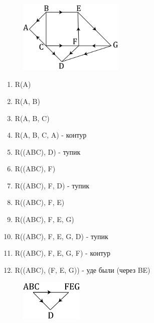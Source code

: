 \documentclass[discrete.tex]{subfiles}
\begin{document}
  \begin{example}\
    \begin{figure}[H]
            \includegraphics[width=5cm]{pics/39_1}
            \centering
    \end{figure}
    \begin{enumerate}
      \item R(A)
      \item R(A, B)
      \item R(A, B, C)
      \item R(A, B, C, A) - контур
      \item R((ABC), D) - тупик
      \item R((ABC), F)
      \item R((ABC), F, D) - тупик
      \item R((ABC), F, E)
      \item R((ABC), F, E, G)
      \item R((ABC), F, E, G, D) - тупик
      \item R((ABC), F, E, G, F) - контур
      \item R((ABC), (F, E, G)) - уде были (через BE)
    \end{enumerate}
    \begin{figure}[H]
            \includegraphics[width=3cm]{pics/39_2}
            \centering
    \end{figure}
  \end{example}
\end{document}
